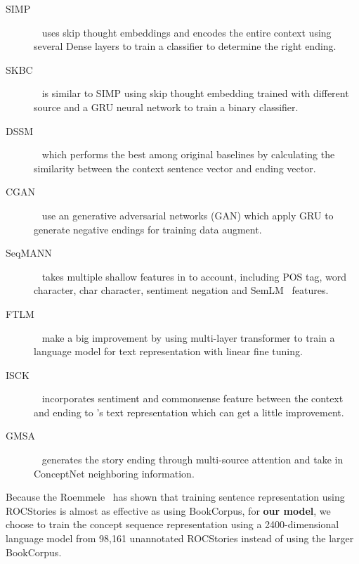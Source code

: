 \begin{description}
\item[SIMP]~\cite{srinivasan2018simple} uses skip thought embeddings and 
encodes the entire context using several Dense layers to train 
a classifier to determine the right ending.

\item[SKBC]~\cite{roemmele2017rnn} is similar to SIMP using skip thought 
embedding trained with different source and a GRU neural network to 
train a binary classifier.

\item[DSSM]~\cite{mostafazadeh2016corpus} which performs the best 
among original baselines by calculating  the similarity between the 
context sentence vector and ending vector.

\item[CGAN]~\cite{wang2017conditional} use an generative adversarial 
networks (GAN) which apply GRU to generate negative endings for 
training data augment.

\item[SeqMANN]~\cite{li2018multi} takes multiple shallow features in 
to account, including POS tag, word character, char character, 
sentiment negation and SemLM~\cite{peng2016two} features.

\item[FTLM]~\cite{radford2018improving} make a big improvement by using 
multi-layer transformer to train a language model for text representation 
with linear fine tuning.

\item[ISCK]~\cite{chen2018incorporating} incorporates  sentiment and 
commonsense feature between the context and ending to 
\citeauthor{radford2018improving}'s text representation which can get a little improvement.

\item[GMSA]~\cite{guan2018story} generates the story ending through 
multi-source attention and take in ConceptNet neighboring information.
\end{description}

Because the Roemmele~\cite{roemmele2017rnn} has shown that training 
sentence representation using ROCStories is almost as effective as
using BookCorpus, for {\bf our model}, we choose to train the
concept sequence representation  
using a 2400-dimensional language model\cite{kiros2015skip} 
from 98,161 unannotated ROCStories instead of using
the larger BookCorpus. 

